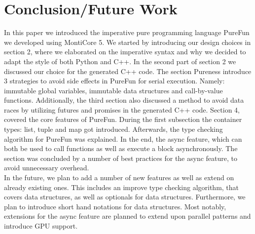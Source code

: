 \section{Conclusion/Future Work}
In this paper we introduced the imperative pure programming language PureFun we developed using MontiCore 5. We started by introducing our design choices in section 2, where we elaborated on the imperative syntax and why we decided to adapt the style of both Python and C++. In the second part of section 2 we discussed our choice for the generated C++ code. The section Pureness introduce 3 strategies to avoid side effects in PureFun for serial execution. Namely: immutable global variables, immutable data structures and call-by-value functions. Additionally, the third section also discussed a method to avoid data races by utilizing futures and promises in the generated C++ code. Section 4, covered the core features of PureFun. During the first subsection the container types: list, tuple and map got introduced. Afterwards, the type checking algorithm for PureFun was explained. In the end, the async feature, which can both be used to call functions as well as execute a block asynchronously. The section was concluded by a number of best practices for the async feature, to avoid unnecessary overhead.\\
In the future, we plan to add a number of new features as well as extend on already existing ones. This includes an improve type checking algorithm, that covers data structures, as well as optionals for data structures. Furthermore, we plan to introduce short hand notations for data structures. Most notably, extensions for the async feature are planned to extend upon parallel patterns and introduce GPU support.